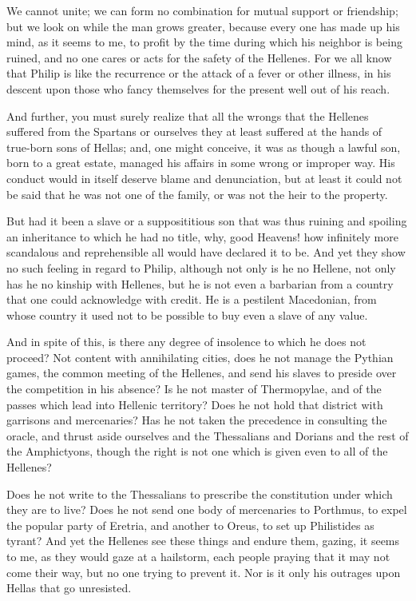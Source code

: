 \documentclass[a4paper]{amsbook}
\begin{document}
We cannot unite; we can form no combination for mutual support or friendship; but we look on while the man grows greater, because every one has made up his mind, as it seems to me, to profit by the time during which his neighbor is being ruined, and no one cares or acts for the safety of the Hellenes. For we all know that Philip is like the recurrence or the attack of a fever or other illness, in his descent upon those who fancy themselves for the present well out of his reach.

And further, you must surely realize that all the wrongs that the Hellenes suffered from the Spartans or ourselves they at least suffered at the hands of true-born sons of Hellas; and, one might conceive, it was as though a lawful son, born to a great estate, managed his affairs in some wrong or improper way. His conduct would in itself deserve blame and denunciation, but at least it could not be said that he was not one of the family, or was not the heir to the property.

But had it been a slave or a supposititious son that was thus ruining and spoiling an inheritance to which he had no title, why, good Heavens! how infinitely more scandalous and reprehensible all would have declared it to be. And yet they show no such feeling in regard to Philip, although not only is he no Hellene, not only has he no kinship with Hellenes, but he is not even a barbarian from a country that one could acknowledge with credit. He is a pestilent Macedonian, from whose country it used not to be possible to buy even a slave of any value.

And in spite of this, is there any degree of insolence to which he does not proceed? Not content with annihilating cities, does he not manage the Pythian games, the common meeting of the Hellenes, and send his slaves to preside over the competition in his absence? Is he not master of Thermopylae, and of the passes which lead into Hellenic territory? Does he not hold that district with garrisons and mercenaries? Has he not taken the precedence in consulting the oracle, and thrust aside ourselves and the Thessalians and Dorians and the rest of the Amphictyons, though the right is not one which is given even to all of the Hellenes?

Does he not write to the Thessalians to prescribe the constitution under which they are to live? Does he not send one body of mercenaries to Porthmus, to expel the popular party of Eretria, and another to Oreus, to set up Philistides as tyrant? And yet the Hellenes see these things and endure them, gazing, it seems to me, as they would gaze at a hailstorm, each people praying that it may not come their way, but no one trying to prevent it. Nor is it only his outrages upon Hellas that go unresisted.
\end{document}
